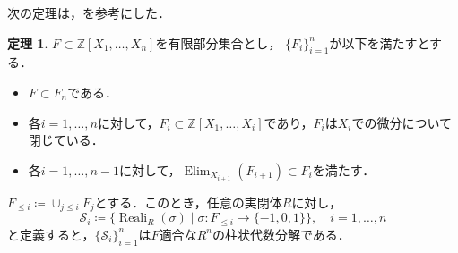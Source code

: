 \documentclass[uplatex, dvipdfmx]{jsarticle}
\numberwithin{equation}{section}
\newcommand{\Z}{\mathbb{Z}}
\newcommand{\map}[3]{{#1}\colon{#2}\rightarrow{#3}}
\DeclareMathOperator{\Elim}{Elim}
\DeclareMathOperator{\Reali}{Reali}
\theoremstyle{definition}
\newtheorem{theorem}[definition]{定理}
\begin{document}
次の定理は，\cite[Theorem 5.34]{MR2248869}を参考にした．
\begin{theorem}\label{theorem:improved-cad}
     $F \subset \Z[X_1, \dots, X_n]$を有限部分集合とし，
     $\{F_i\}_{i=1}^n$が以下を満たすとする．
     \begin{itemize}
          \item $F \subset F_n$である．\\
          \item 各$i=1,\dots, n$に対して，$F_i \subset \Z[X_1, \dots, X_i]$であり，$F_i$は$X_i$での微分について閉じている．\\
          \item 各$i=1, \dots, n-1$に対して，$\Elim_{X_{i+1}}(F_{i+1}) \subset F_i$を満たす．
     \end{itemize}

     $F_{\leq i}\coloneqq \cup_{j \leq i} F_j$とする．このとき，任意の実閉体$R$に対し，
     \begin{equation}
          \mathcal{S}_i \coloneqq \{\Reali_R(\sigma) \mid \map{\sigma}{F_{\leq i}}{\{-1,0,1\}}\}, \quad i=1, \dots, n 
     \end{equation}          
     と定義すると，$\{\mathcal{S}_i\}_{i=1}^n$は$F$適合な$R^n$の柱状代数分解である．
\end{theorem}
\end{document}
